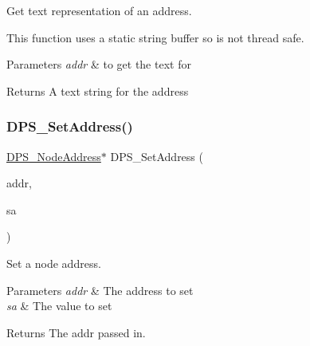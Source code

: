 Get text representation of an address. 

This function uses a static string buffer so is not thread safe.


\begin{DoxyParams}{Parameters}
{\em addr} & to get the text for\\
\hline
\end{DoxyParams}
\begin{DoxyReturn}{Returns}
A text string for the address 
\end{DoxyReturn}
\mbox{\label{group__nodeaddress_ga6231c243c483bd2d282f7df734a98946}} 
\subsubsection{\texorpdfstring{D\+P\+S\+\_\+\+Set\+Address()}{DPS\_SetAddress()}}
{\footnotesize\ttfamily \hyperlink{group__nodeaddress_ga9e9f56aa38e82b4edcef7eb81e9f5bd2}{D\+P\+S\+\_\+\+Node\+Address}$\ast$ D\+P\+S\+\_\+\+Set\+Address (\begin{DoxyParamCaption}\item[{\hyperlink{group__nodeaddress_ga9e9f56aa38e82b4edcef7eb81e9f5bd2}{D\+P\+S\+\_\+\+Node\+Address} $\ast$}]{addr,  }\item[{const struct sockaddr $\ast$}]{sa }\end{DoxyParamCaption})}



Set a node address. 


\begin{DoxyParams}{Parameters}
{\em addr} & The address to set \\
\hline
{\em sa} & The value to set\\
\hline
\end{DoxyParams}
\begin{DoxyReturn}{Returns}
The addr passed in. 
\end{DoxyReturn}
